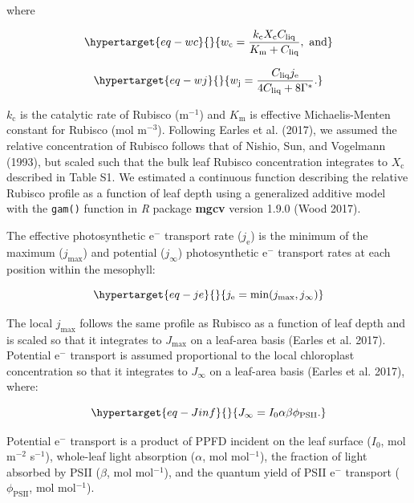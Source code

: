 \documentclass[
  letterpaper,
  DIV=11,
  numbers=noendperiod]{scrartcl}
\begin{document}
where

\begin{equation}\protect\hypertarget{eq-wc}{}{ w_\text{c} = \frac{k_\text{c} X_\text{c} C_\text{liq}}{K_\text{m} + C_\text{liq}},~\text{and}}\label{eq-wc}\end{equation}

\begin{equation}\protect\hypertarget{eq-wj}{}{ w_\text{j} = \frac{C_\text{liq} j_\text{e}}{4 C_\text{liq} + 8 \Gamma^*}.}\label{eq-wj}\end{equation}

\(k_\text{c}\) is the catalytic rate of Rubisco (m\(^{-1}\)) and
\(K_\text{m}\) is effective Michaelis-Menten constant for Rubisco (mol
m\(^{-3}\)). Following Earles et al. (2017), we assumed the relative
concentration of Rubisco follows that of Nishio, Sun, and Vogelmann
(1993), but scaled such that the bulk leaf Rubisco concentration
integrates to \(X_\text{c}\) described in Table S1. We estimated a
continuous function describing the relative Rubisco profile as a
function of leaf depth using a generalized additive model with the
\texttt{gam()} function in \emph{R} package \textbf{mgcv} version 1.9.0
(Wood 2017).

The effective photosynthetic e\(^{-}\) transport rate (\(j_\text{e}\))
is the minimum of the maximum (\(j_\text{max}\)) and potential
(\(j_\infty\)) photosynthetic e\(^{-}\) transport rates at each position
within the mesophyll:

\begin{equation}\protect\hypertarget{eq-je}{}{ j_\text{e} = \text{min}(j_\text{max}, j_\infty) }\label{eq-je}\end{equation}

The local \(j_\text{max}\) follows the same profile as Rubisco as a
function of leaf depth and is scaled so that it integrates to
\(J_\text{max}\) on a leaf-area basis (Earles et al. 2017). Potential
e\(^{-}\) transport is assumed proportional to the local chloroplast
concentration so that it integrates to \(J_\infty\) on a leaf-area basis
(Earles et al. 2017), where:

\begin{equation}\protect\hypertarget{eq-Jinf}{}{ J_\infty = I_0 \alpha \beta \phi_\text{PSII}.}\label{eq-Jinf}\end{equation}

Potential e\(^{-}\) transport is a product of PPFD incident on the leaf
surface (\(I_0\), mol m\(^{-2}\) s\(^{-1}\)), whole-leaf light
absorption (\(\alpha\), mol mol\(^{-1}\)), the fraction of light
absorbed by PSII (\(\beta\), mol mol\(^{-1}\)), and the quantum yield of
PSII e\(^{-}\) transport (\(\phi_\text{PSII}\), mol mol\(^{-1}\)).
\end{document}
